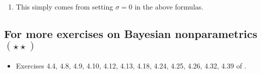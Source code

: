 \documentclass{article}
\begin{document}
{\begin{enumerate}
\begin{align}
&= \frac{\mathbb{E}[K_n]\sigma (n- \alpha ) + n \alpha - \sigma^2 (\mathbb{E}[K_n]^2 +  \mbox{Var}(K_n))}{(n+\alpha)^2},\label{eq: var 1st}
\end{align}
while \eqref{eq: exp_PY_rec} provides for second term of the right-hand side of \eqref{eq:var} 
 \begin{equation}\label{eq: var 2nd}
\mbox{Var}(\mathbb{E}[K_{n+1}\mid K_1,\ldots,K_{n}=K])=\left( \frac{\sigma + n + \alpha}{n+\alpha}\right)^2 \mbox{Var}(K_n).
\end{equation}
Then combining \eqref{eq: var 1st} and \eqref{eq: var 2nd},  the following recursive formula holds
\begin{align}\label{eq:s2-recursive}
 \mbox{Var}(K_{n+1}) &= \mbox{Var}(K_n)\frac{n + \alpha + 2\sigma}{n+\alpha} + \frac{\sigma\mathbb{E}[K_n](n - \alpha - \sigma\mathbb{E}[K_n]) + n \alpha}{(n+\alpha)^2}\nonumber\\
 &= \mbox{Var}(K_n)\frac{n + \alpha + 2\sigma}{n+\alpha} + \frac{(\sigma\mathbb{E}[K_n]+ \alpha)(n - \sigma\mathbb{E}[K_n])}{(n+\alpha)^2},
\end{align} 
which simplifies to the desired expression by using 
$$\mathbb{E}[K_n] = \frac{\alpha}{\sigma}\left(\frac{(\alpha +\sigma)_{n}}{(\alpha)_{n}}-1\right).$$
\item This simply comes from setting $\sigma = 0$ in the above formulas.
\end{enumerate}
}

 \subsection{For more exercises on Bayesian nonparametrics $(\star\star)$}

 \begin{itemize}
 	\item Exercises 4.4, 4.8, 4.9, 4.10, 4.12, 4.13, 4.18, 4.24, 4.25, 4.26, 4.32, 4.39
 of \cite{ghosal2017fundamentals}.
 \end{itemize}

\end{document}
